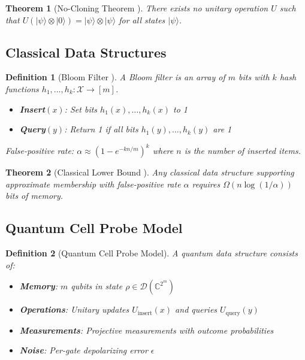 \documentclass[11pt,letterpaper]{article}
\newtheorem{theorem}{Theorem}
\newtheorem{definition}{Definition}
\begin{document}
\begin{theorem}[No-Cloning Theorem \cite{wootters1982single}]
\label{thm:no_cloning}
There exists no unitary operation $U$ such that $U(|\psi\rangle \otimes |0\rangle) = |\psi\rangle \otimes |\psi\rangle$ for all states $|\psi\rangle$.
\end{theorem}

\subsection{Classical Data Structures}

\begin{definition}[Bloom Filter \cite{bloom1970space}]
A Bloom filter is an array of $m$ bits with $k$ hash functions $h_1, \ldots, h_k : \mathcal{X} \to [m]$. 
\begin{itemize}
\item \textbf{Insert}$(x)$: Set bits $h_1(x), \ldots, h_k(x)$ to 1
\item \textbf{Query}$(y)$: Return 1 if all bits $h_1(y), \ldots, h_k(y)$ are 1
\end{itemize}
False-positive rate: $\alpha \approx (1 - e^{-kn/m})^k$ where $n$ is the number of inserted items.
\end{definition}

\begin{theorem}[Classical Lower Bound \cite{patrascu2008lower}]
\label{thm:classical_lower_bound}
Any classical data structure supporting approximate membership with false-positive rate $\alpha$ requires $\Omega(n \log(1/\alpha))$ bits of memory.
\end{theorem}

\subsection{Quantum Cell Probe Model}

\begin{definition}[Quantum Cell Probe Model]
A quantum data structure consists of:
\begin{itemize}
\item \textbf{Memory}: $m$ qubits in state $\rho \in \mathcal{D}(\mathbb{C}^{2^m})$
\item \textbf{Operations}: Unitary updates $U_{\text{insert}}(x)$ and queries $U_{\text{query}}(y)$
\item \textbf{Measurements}: Projective measurements with outcome probabilities
\item \textbf{Noise}: Per-gate depolarizing error $\epsilon$
\end{itemize}
\end{definition}
\end{document}
